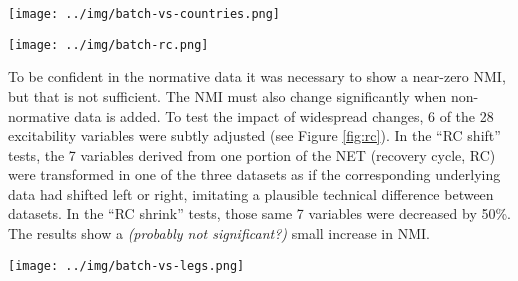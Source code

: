 \documentclass[12pt]{article}
\begin{document}
\pagebreak

\begin{figure*}
  \centering
       \texttt{[image: ../img/batch-vs-countries.png]}
         \caption{}
  \label{fig:vs-countries}
\end{figure*}


\pagebreak

\begin{figure*}
  \centering
       \texttt{[image: ../img/batch-rc.png]}
         \caption{}
  \label{fig:rc}
\end{figure*}

To be confident in the normative data it was necessary to show a near-zero NMI, but that is not sufficient. The NMI must also change significantly when non-normative data is added. To test the impact of widespread changes, 6 of the 28 excitability variables were subtly adjusted (see Figure \ref{fig:rc}). In the ``RC shift'' tests, the 7 variables derived from one portion of the NET (recovery cycle, RC) were transformed in one of the three datasets as if the corresponding underlying data had shifted left or right, imitating a plausible technical difference between datasets. In the ``RC shrink'' tests, those same 7 variables were decreased by 50\%. The results show a \emph{(probably not significant?)} small increase in NMI.


\pagebreak

\begin{figure*}
  \centering
       \texttt{[image: ../img/batch-vs-legs.png]}
         \caption{}
  \label{fig:vs-legs}
\end{figure*}
\end{document}
